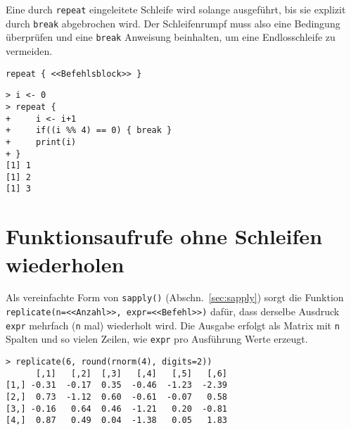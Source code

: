 Eine durch \lstinline!repeat! eingeleitete Schleife wird solange ausgeführt, bis sie explizit durch \lstinline!break! abgebrochen wird. Der Schleifenrumpf muss also eine Bedingung überprüfen und eine \lstinline!break! Anweisung beinhalten, um eine Endlosschleife zu vermeiden.
\begin{lstlisting}
repeat { <<Befehlsblock>> }
\end{lstlisting}

\begin{lstlisting}
> i <- 0
> repeat {
+     i <- i+1
+     if((i %% 4) == 0) { break }
+     print(i)
+ }
[1] 1
[1] 2
[1] 3
\end{lstlisting}

\section{Funktionsaufrufe ohne Schleifen wiederholen}
\label{sec:replicate}

Als vereinfachte Form von \lstinline!sapply()! (Abschn.\ \ref{sec:sapply}) sorgt die Funktion \lstinline!replicate(n=<<Anzahl>>, expr=<<Befehl>>)! dafür, dass derselbe Ausdruck \lstinline!expr! mehrfach (\lstinline!n! mal) wiederholt wird. Die Ausgabe erfolgt als Matrix mit \lstinline!n! Spalten und so vielen Zeilen, wie \lstinline!expr! pro Ausführung Werte erzeugt.
\begin{lstlisting}
> replicate(6, round(rnorm(4), digits=2))
      [,1]   [,2]  [,3]   [,4]   [,5]   [,6]
[1,] -0.31  -0.17  0.35  -0.46  -1.23  -2.39
[2,]  0.73  -1.12  0.60  -0.61  -0.07   0.58
[3,] -0.16   0.64  0.46  -1.21   0.20  -0.81
[4,]  0.87   0.49  0.04  -1.38   0.05   1.83
\end{lstlisting}

